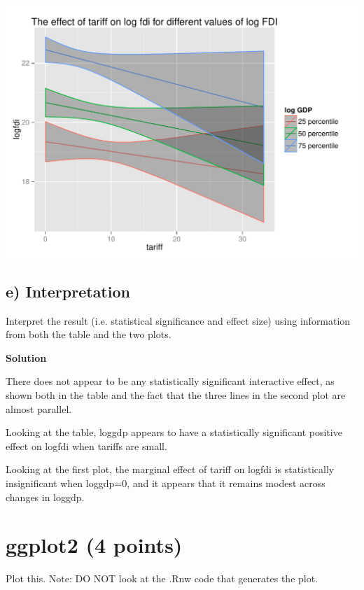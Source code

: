 \documentclass{article}\usepackage[]{graphicx}\usepackage[]{color}
\makeatletter
\def\maxwidth{ %
  \ifdim\Gin@nat@width>\linewidth
    \linewidth
  \else
    \Gin@nat@width
  \fi
}
\newenvironment{kframe}{%
 \def\at@end@of@kframe{}%
 \ifinner\ifhmode%
  \def\at@end@of@kframe{\end{minipage}}%
  \begin{minipage}{\columnwidth}%
 \fi\fi%
 \def\FrameCommand##1{\hskip\@totalleftmargin \hskip-\fboxsep
 \colorbox{shadecolor}{##1}\hskip-\fboxsep
     \hskip-\linewidth \hskip-\@totalleftmargin \hskip\columnwidth}%
 \MakeFramed {\advance\hsize-\width
   \@totalleftmargin\z@ \linewidth\hsize
   \@setminipage}}%
 {\par\unskip\endMakeFramed%
 \at@end@of@kframe}
\newenvironment{knitrout}{}{} %
\makeatother
\begin{document}
\begin{knitrout}
\begin{kframe}
{\ttfamily\noindent\color{warningcolor}{\#\# Warning: Removed 282 rows containing missing values (geom\_path).}}\end{kframe}
\includegraphics[width=\maxwidth]{figure/unnamed-chunk-4-1} 

\end{knitrout}

\subsection*{e) Interpretation}

Interpret the result (i.e. statistical significance and effect size) using information from both the table and the two plots.

\textbf{Solution}

There does not appear to be any statistically significant interactive effect, as shown both in the table and the fact that the three lines in the second plot are almost parallel.

Looking at the table, loggdp appears to have a statistically significant positive effect on logfdi when tariffs are small.

Looking at the first plot, the marginal effect of tariff on logfdi is statistically insignificant when loggdp=0, and it appears that it remains modest across changes in loggdp.

\section{ggplot2 (4 points)}

Plot this. Note: DO NOT look at the .Rnw code that generates the plot.
\end{document}
